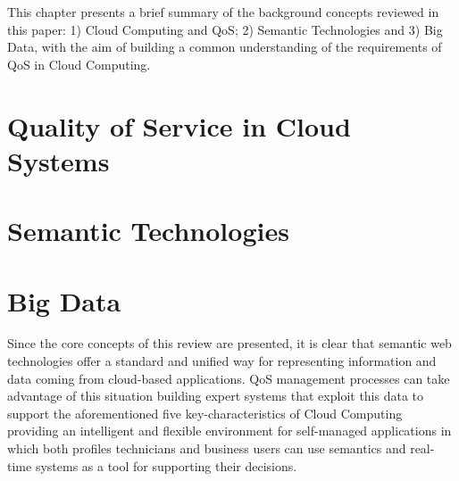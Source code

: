 This chapter presents a brief summary of the background concepts reviewed in this paper: 
1) Cloud Computing and QoS; 2) Semantic Technologies and 3) Big Data, with the 
aim of building a common understanding of the requirements of QoS in Cloud Computing.
\section{Quality of Service in Cloud Systems}\label{qos-cloud-index}

\section{Semantic Technologies}

\section{Big Data}


Since the core concepts of this review are presented, it is clear that semantic 
web technologies offer a standard and unified way for representing information 
and data coming from cloud-based applications. QoS management processes can 
take advantage of this situation building expert systems that exploit this data to support the aforementioned five 
key-characteristics of Cloud Computing providing an intelligent and flexible environment for 
self-managed applications in which both profiles technicians and business users can use 
semantics and real-time systems as a tool for supporting their decisions.
